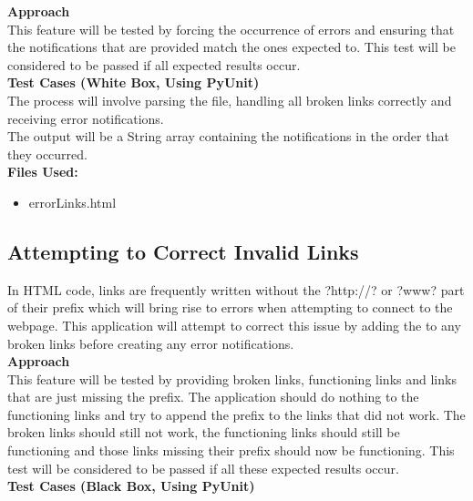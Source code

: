 \documentclass[12pt, titlepage]{article}
\begin{document}
\textbf{Approach}\\
This feature will be tested by forcing the occurrence of errors and ensuring that the notifications that are provided match the ones expected to. This test will be considered to be passed if all expected results occur.\\

\textbf{Test Cases (White Box, Using PyUnit)}\\
The process will involve parsing the file, handling all broken links correctly and receiving error notifications.\\
The output will be a String array containing the notifications in the order that they occurred.\\

\textbf{Files Used:}
\begin{itemize}
\item errorLinks.html
\end{itemize}

\subsection{Attempting to Correct Invalid Links}
In HTML code, links are frequently written without the ?http://? or ?www? part of their prefix which will bring rise to errors when attempting to connect to the webpage. This application will attempt to correct this issue by adding the to any broken links before creating any error notifications.\\

\textbf{Approach}\\
This feature will be tested by providing broken links, functioning links and links that are just missing the prefix. The application should do nothing to the functioning links and try to append the prefix to the links that did not work. The broken links should still not work, the functioning links should still be functioning and those links missing their prefix should now be functioning. This test will be considered to be passed if all these expected results occur.\\

\textbf{Test Cases (Black Box, Using PyUnit)}\\
\end{document}
